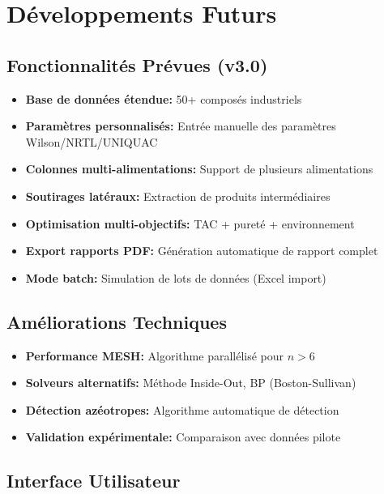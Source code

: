 \documentclass[11pt,a4paper]{article}
\begin{document}
\section{Développements Futurs}

\subsection{Fonctionnalités Prévues (v3.0)}

\begin{itemize}[leftmargin=*]
    \item \textbf{Base de données étendue:} 50+ composés industriels
    \item \textbf{Paramètres personnalisés:} Entrée manuelle des paramètres Wilson/NRTL/UNIQUAC
    \item \textbf{Colonnes multi-alimentations:} Support de plusieurs alimentations
    \item \textbf{Soutirages latéraux:} Extraction de produits intermédiaires
    \item \textbf{Optimisation multi-objectifs:} TAC + pureté + environnement
    \item \textbf{Export rapports PDF:} Génération automatique de rapport complet
    \item \textbf{Mode batch:} Simulation de lots de données (Excel import)
\end{itemize}

\subsection{Améliorations Techniques}

\begin{itemize}[leftmargin=*]
    \item \textbf{Performance MESH:} Algorithme parallélisé pour $n > 6$
    \item \textbf{Solveurs alternatifs:} Méthode Inside-Out, BP (Boston-Sullivan)
    \item \textbf{Détection azéotropes:} Algorithme automatique de détection
    \item \textbf{Validation expérimentale:} Comparaison avec données pilote
\end{itemize}

\subsection{Interface Utilisateur}
\end{document}
